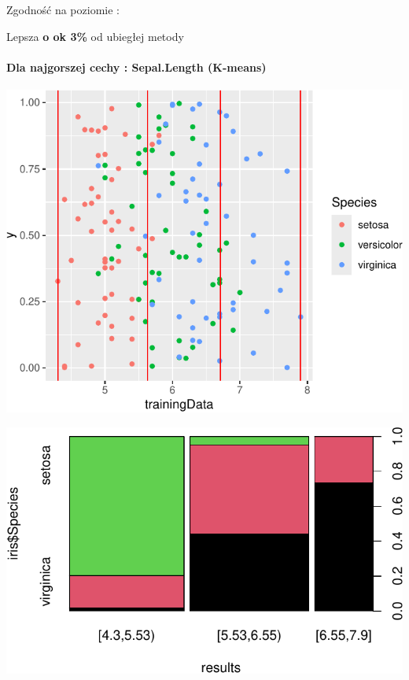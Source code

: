\documentclass[
  12pt,
]{article}
\begin{document}
Zgodność na poziomie :

Lepsza \textbf{o ok 3\%} od ubiegłej metody

\paragraph{Dla najgorszej cechy : Sepal.Length
(K-means)}\label{dla-najgorszej-cechy-sepal.length-k-means}

\begin{center}\includegraphics{Sprawozdanie2_files/figure-latex/kMeans_najg-1} \end{center}

\begin{center}\includegraphics{Sprawozdanie2_files/figure-latex/tabela_kondygnacji_3_najg-1} \end{center}
\end{document}

